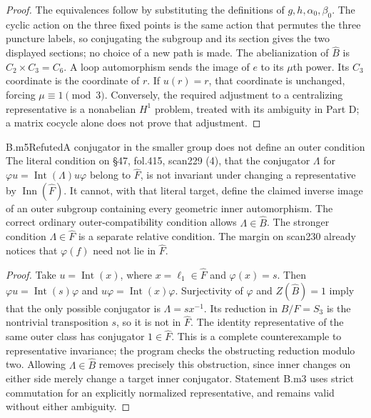 \begin{proof}
The equivalences follow by substituting the definitions of $g,h,\alpha_0,\beta_0$. The cyclic action on the three fixed points is the same action that permutes the three puncture labels, so conjugating the subgroup and its section gives the two displayed sections; no choice of a new path is made. The abelianization of $\widehat B$ is $C_2\times C_3=C_6$. A loop automorphism sends the image of $e$ to its $\mu$th power. Its $C_3$ coordinate is the coordinate of $r$. If $u(r)=r$, that coordinate is unchanged, forcing $\mu\equiv1\pmod3$. Conversely, the required adjustment to a centralizing representative is a nonabelian $H^1$ problem, treated with its ambiguity in Part D; a matrix cocycle alone does not prove that adjustment.
\end{proof}

\begin{claim}{B.m5}{Refuted}{A conjugator in the smaller group does not define an outer condition}
The literal condition on \S47, fol.415, scan229 (4), that the conjugator $\Lambda$ for
$\varphi u=\operatorname{Int}(\Lambda)u\varphi$ belong to $\widehat F$, is not invariant under changing a representative by $\operatorname{Inn}(\widehat F)$. It cannot, with that literal target, define the claimed inverse image of an outer subgroup containing every geometric inner automorphism. The correct ordinary outer-compatibility condition allows $\Lambda\in\widehat B$. The stronger condition $\Lambda\in\widehat F$ is a separate relative condition. The margin on scan230 already notices that $\varphi(f)$ need not lie in $\widehat F$.
\end{claim}
\begin{proof}
Take $u=\operatorname{Int}(x)$, where $x=\ell_1\in\widehat F$ and $\varphi(x)=s$. Then
$\varphi u=\operatorname{Int}(s)\varphi$ and
$u\varphi=\operatorname{Int}(x)\varphi$.
Surjectivity of $\varphi$ and $Z(\widehat B)=1$ imply that the only possible conjugator is $\Lambda=sx^{-1}$. Its reduction in $B/F=S_3$ is the nontrivial transposition $s$, so it is not in $\widehat F$. The identity representative of the same outer class has conjugator $1\in\widehat F$. This is a complete counterexample to representative invariance; the program checks the obstructing reduction modulo two. Allowing $\Lambda\in\widehat B$ removes precisely this obstruction, since inner changes on either side merely change a target inner conjugator. Statement B.m3 uses strict commutation for an explicitly normalized representative, and remains valid without either ambiguity.
\end{proof}

